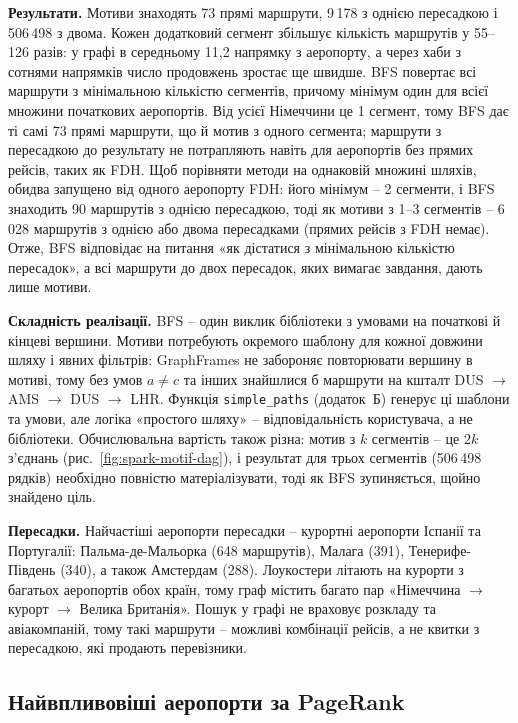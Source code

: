 \documentclass{iasa-lab}
\begin{document}
\textbf{Результати.} Мотиви знаходять 73 прямі маршрути, 9\,178 з однією пересадкою і 506\,498 з двома. Кожен додатковий сегмент збільшує кількість маршрутів у 55--126 разів: у графі в середньому 11,2 напрямку з аеропорту, а через хаби з сотнями напрямків число продовжень зростає ще швидше. BFS повертає всі маршрути з мінімальною кількістю сегментів, причому мінімум один для всієї множини початкових аеропортів. Від усієї Німеччини це 1 сегмент, тому BFS дає ті самі 73 прямі маршрути, що й мотив з одного сегмента; маршрути з пересадкою до результату не потрапляють навіть для аеропортів без прямих рейсів, таких як FDH. Щоб порівняти методи на однаковій множині шляхів, обидва запущено від одного аеропорту FDH: його мінімум -- 2 сегменти, і BFS знаходить 90 маршрутів з однією пересадкою, тоді як мотиви з 1--3 сегментів -- 6\,028 маршрутів з однією або двома пересадками (прямих рейсів з FDH немає). Отже, BFS відповідає на питання «як дістатися з мінімальною кількістю пересадок», а всі маршрути до двох пересадок, яких вимагає завдання, дають лише мотиви.

\textbf{Складність реалізації.} BFS -- один виклик бібліотеки з умовами на початкові й кінцеві вершини. Мотиви потребують окремого шаблону для кожної довжини шляху і явних фільтрів: GraphFrames не забороняє повторювати вершину в мотиві, тому без умов $a \ne c$ та інших знайшлися б маршрути на кшталт DUS $\to$ AMS $\to$ DUS $\to$ LHR. Функція \texttt{simple\_paths} (додаток~Б) генерує ці шаблони та умови, але логіка «простого шляху» -- відповідальність користувача, а не бібліотеки. Обчислювальна вартість також різна: мотив з $k$ сегментів -- це $2k$ з'єднань (рис.~\ref{fig:spark-motif-dag}), і результат для трьох сегментів (506\,498 рядків) необхідно повністю матеріалізувати, тоді як BFS зупиняється, щойно знайдено ціль.

\textbf{Пересадки.} Найчастіші аеропорти пересадки -- курортні аеропорти Іспанії та Португалії: Пальма-де-Мальорка (648 маршрутів), Малага (391), Тенерифе-Південь (340), а також Амстердам (288). Лоукостери літають на курорти з багатьох аеропортів обох країн, тому граф містить багато пар «Німеччина $\to$ курорт $\to$ Велика Британія». Пошук у графі не враховує розкладу та авіакомпаній, тому такі маршрути -- можливі комбінації рейсів, а не квитки з пересадкою, які продають перевізники.

\subsection{Найвпливовіші аеропорти за PageRank}
\end{document}
